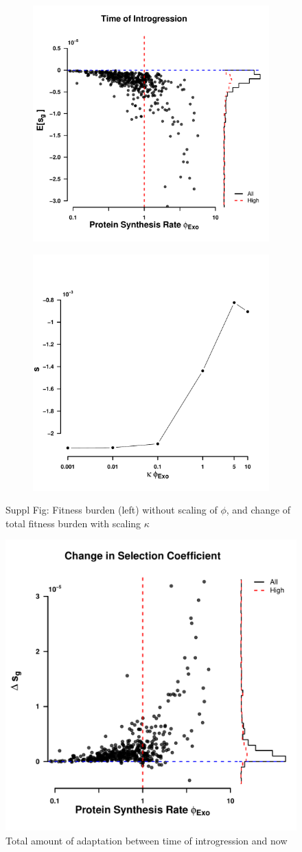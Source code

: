 \documentclass[12pt]{article}
\begin{document}
\begin{figure}[h]
    \centering
    \begin{subfigure}
        \centering
        \includegraphics[width=.45\textwidth]{img/fitness_difference_gos_kappa1.pdf}
    \end{subfigure}
    \begin{subfigure}
        \centering
        \includegraphics[width=.45\textwidth]{img/fitness_phi_scaling_gos.pdf}
    \end{subfigure}
    \caption{Suppl Fig: Fitness burden (left) without scaling of $\phi$, and change of total fitness burden with scaling $\kappa$}
    \label{fig:sne_scaling}
\end{figure}

\begin{figure}[H]
     \centering
	\includegraphics[width=.45\textwidth]{img/adaptation_total.pdf}
	\caption{Total amount of adaptation between time of introgression and now}
	\label{fig:adapt_tot}
\end{figure}
\end{document}
